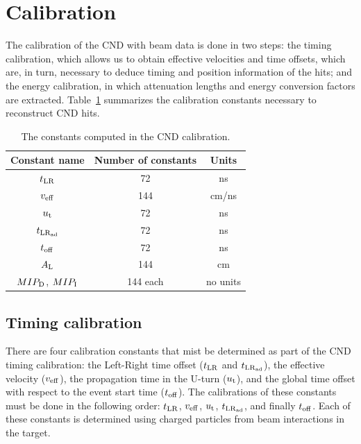 \section{Calibration}\label{sec_cnd_calib}

The calibration of the CND with beam data is done in two steps: the timing calibration, which allows us to obtain effective velocities and time offsets, which are, in turn, necessary to deduce timing and position information of the hits; and the energy calibration, in which attenuation lengths and energy conversion factors are extracted.
Table~\ref{table_cnd_constants} summarizes the calibration constants necessary to reconstruct CND hits.

\begin{table}
\begin{tabular}{|c|c|c|}
\hline
Constant name & Number of constants  & Units \\
\hline
$t_{\rm{LR}}$ & 72 & ns\\
\hline
$v_{\rm{eff}}$ & 144 & cm/ns \\
\hline
$u_{\rm{t}}$ & 72 & ns \\
\hline
$t_{\rm{LR}_{\rm{ad}}}$ & 72 & ns \\
\hline
$t_{\rm{off}}$ &72 & ns\\
\hline
$A_{\rm{L}}$ & 144 & cm\\
\hline
$MIP_{\rm{D}}$, $MIP_{\rm{I}}$ & 144 each & no units \\
\hline
\end{tabular}
\caption{The constants computed in the CND calibration.}
\label{table_cnd_constants}
\end{table}

\subsection{Timing calibration}
There are four calibration constants that mist be determined as part of the CND timing calibration: the Left-Right time offset ($t_{\rm{LR}}$ and  $t_{\rm{LR}_{\rm{ad}}}$), the effective velocity ($v_{\rm{eff}}$), the propagation time in the U-turn ($u_{\rm{t}}$), and the global time offset with respect to the event start time ($t_{\rm{off}}$). The calibrations of these constants must be done in the following order: $t_{\rm{LR}}$, $v_{\rm{eff}}$, $u_{\rm{t}}$,  $t_{\rm{LR}_{\rm{ad}}}$, and finally $t_{\rm{off}}$. 
Each of these constants is determined using charged particles from beam interactions in the target.

